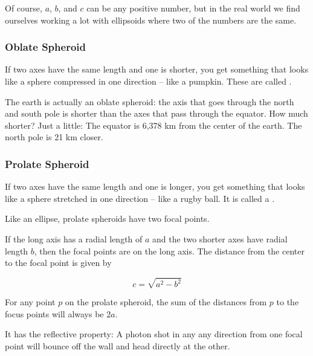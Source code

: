 Of course, $a$, $b$, and $c$ can be any positive number, but in the
real world we find ourselves working a lot with ellipsoids where two
of the numbers are the same.

\subsubsection{Oblate Spheroid}

If two axes have the same length and one is shorter, you get something
that looks like a sphere compressed in one direction -- like a
pumpkin.  These are called .

The earth is actually an oblate spheroid: the axis that goes through
the north and south pole is shorter than the axes that pass through
the equator.  How much shorter? Just a little: The equator is 6,378 km
from the center of the earth. The north pole is 21 km closer.

\subsubsection{Prolate Spheroid}

If two axes have the same length and one is longer, you get something
that looks like a sphere stretched in one direction -- like a rugby
ball. It is called a .

Like an ellipse, prolate spheroids have two focal points.

\begin{mdframed}[style=important, frametitle={Focal Points of a Prolate Spheroid}]

  If the long axis has a radial length of $a$ and the two shorter axes
  have radial length $b$, then the focal points are on the long axis.  The distance from the center to the focal point is given by

  $$c = \sqrt{a^2 - b^2}$$

  For any point $p$ on the prolate spheroid, the sum of the distances
  from $p$ to the focus points will always be $2a$.

  It has the reflective property: A photon shot in any any direction
  from one focal point will bounce off the wall and head directly at the other.
  
\end{mdframed}
